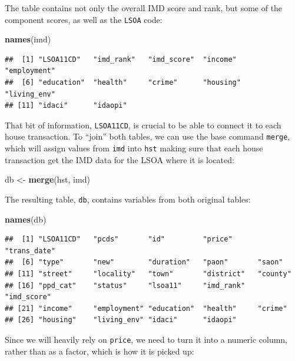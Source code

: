 \documentclass[
]{book}
\newenvironment{Shaded}{\begin{snugshade}}{\end{snugshade}}
\newcommand{\KeywordTok}[1]{\textcolor[rgb]{0.13,0.29,0.53}{\textbf{#1}}}
\newcommand{\NormalTok}[1]{#1}
\newcommand{\StringTok}[1]{\textcolor[rgb]{0.31,0.60,0.02}{#1}}
\begin{document}
The table contains not only the overall IMD score and rank, but some of the component scores, as well as the \texttt{LSOA} code:

\begin{Shaded}
\begin{Highlighting}[]
\KeywordTok{names}\NormalTok{(imd)}
\end{Highlighting}
\end{Shaded}

\begin{verbatim}
##  [1] "LSOA11CD"   "imd_rank"   "imd_score"  "income"     "employment"
##  [6] "education"  "health"     "crime"      "housing"    "living_env"
## [11] "idaci"      "idaopi"
\end{verbatim}

That bit of information, \texttt{LSOA11CD}, is crucial to be able to connect it to each house transaction. To ``join'' both tables, we can use the base command \texttt{merge}, which will assign values from \texttt{imd} into \texttt{hst} making sure that each house transaction get the IMD data for the LSOA where it is located:

\begin{Shaded}
\begin{Highlighting}[]
\NormalTok{db <-}\StringTok{ }\KeywordTok{merge}\NormalTok{(hst, imd)}
\end{Highlighting}
\end{Shaded}

The resulting table, \texttt{db}, contains variables from both original tables:

\begin{Shaded}
\begin{Highlighting}[]
\KeywordTok{names}\NormalTok{(db)}
\end{Highlighting}
\end{Shaded}

\begin{verbatim}
##  [1] "LSOA11CD"   "pcds"       "id"         "price"      "trans_date"
##  [6] "type"       "new"        "duration"   "paon"       "saon"      
## [11] "street"     "locality"   "town"       "district"   "county"    
## [16] "ppd_cat"    "status"     "lsoa11"     "imd_rank"   "imd_score" 
## [21] "income"     "employment" "education"  "health"     "crime"     
## [26] "housing"    "living_env" "idaci"      "idaopi"
\end{verbatim}

Since we will heavily rely on \texttt{price}, we need to turn it into a numeric column, rather than as a factor, which is how it is picked up:
\end{document}
